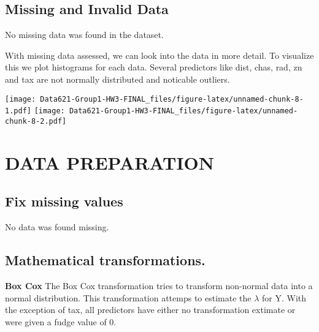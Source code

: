 \documentclass[
]{article}
\begin{document}
\hypertarget{missing-and-invalid-data}{%
\subsection{Missing and Invalid Data}\label{missing-and-invalid-data}}

No missing data was found in the dataset.

With missing data assessed, we can look into the data in more detail. To
visualize this we plot histograms for each data. Several predictors like
dist, chas, rad, zn and tax are not normally distributed and noticable
outliers.

\texttt{[image: Data621-Group1-HW3-FINAL\_files/figure-latex/unnamed-chunk-8-1.pdf]}
\texttt{[image: Data621-Group1-HW3-FINAL\_files/figure-latex/unnamed-chunk-8-2.pdf]}

\hypertarget{data-preparation}{%
\section{DATA PREPARATION}\label{data-preparation}}

\hypertarget{fix-missing-values}{%
\subsection{Fix missing values}\label{fix-missing-values}}

No data was found missing.

\hypertarget{mathematical-transformations.}{%
\subsection{Mathematical
transformations.}\label{mathematical-transformations.}}

\textbf{Box Cox} The Box Cox transformation tries to transform
non-normal data into a normal distribution. This transformation attemps
to estimate the \(\lambda\) for Y. With the exception of tax, all
predictors have either no transformation extimate or were given a fudge
value of 0.
\end{document}
